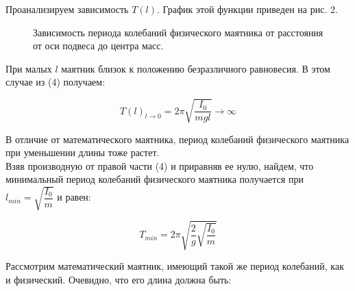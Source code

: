 \documentclass[a4paper]{article}
\begin{document}
Проанализируем зависимость $T(l)$. График этой функции приведен на рис. 2.
\begin{figure}[H]
\caption{Зависимость периода колебаний физического маятника от расстояния от оси подвеса до центра масс.}
\end{figure}


При малых $l$ маятник близок к положению безразличного
равновесия. В этом случае из (4) получаем:

\begin{equation}
	T(l)_{l\rightarrow0}=2\pi\sqrt{\dfrac{I_0}{mgl}}\rightarrow \infty
\end{equation}


В отличие от математического маятника, период колебаний
физического маятника при уменьшении длины тоже растет.\\
Взяв производную от правой части (4) и приравняв ее нулю,
найдем, что минимальный период колебаний физического маятника получается при
$l_{min}=\sqrt{\dfrac{I_0}{m}}$ и равен:

\begin{equation}
	T_{min}=2\pi\sqrt{\dfrac{2}{g}\sqrt{\dfrac{I_0}{m}}}
\end{equation}

Рассмотрим математический маятник, имеющий такой же период колебаний, как и физический. Очевидно, что его длина
должна быть:
\end{document}
